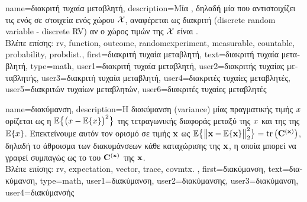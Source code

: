 {name={\foreignlanguage{greek}{διακριτή τυχαία μεταβλητή}}, 
 	description={\foreignlanguage{greek}{Μία} , 
		\foreignlanguage{greek}{δηλαδή μία}  \foreignlanguage{greek}{που αντιστοιχίζει τις}  
		\foreignlanguage{greek}{ενός}  \foreignlanguage{greek}{σε στοιχεία ενός}  
		\foreignlanguage{greek}{χώρου $\mathcal{X}$, αναφέρεται ως διακριτή} (discrete random variable - discrete RV) 
		\foreignlanguage{greek}{αν ο χώρος τιμών της $\mathcal{X}$ είναι}  \cite{BillingsleyProbMeasure}. 
			\\
		\foreignlanguage{greek}{Βλέπε επίσης:} \gls{rv}, \gls{function}, \gls{outcome}, \gls{randomexperiment}, \gls{measurable}, 
		\gls{countable}, \gls{probability}, \gls{probdist}.},
 	first={\foreignlanguage{greek}{διακριτή τυχαία μεταβλητή}},
 	text={\foreignlanguage{greek}{διακριτή τυχαία μεταβλητή}},
	type=math,
	user1={\foreignlanguage{greek}{διακριτή τυχαία μεταβλητή}}, %
   	user2={\foreignlanguage{greek}{διακριτής τυχαίας μεταβλητής}}, %
	user3={\foreignlanguage{greek}{διακριτή τυχαία μεταβλητή}}, %
	user4={\foreignlanguage{greek}{διακριτές τυχαίες μεταβλητές}}, %
   	user5={\foreignlanguage{greek}{διακριτών τυχαίων μεταβλητών}}, %
	user6={\foreignlanguage{greek}{διακριτές τυχαίες μεταβλητές}} %
}

{name={\foreignlanguage{greek}{διακύμανση}},
	description={\foreignlanguage{greek}{Η διακύμανση} (variance) \foreignlanguage{greek}{μίας}
		 \foreignlanguage{greek}{πραγματικής τιμής $x$ ορίζεται ως η}  
		$\mathbb{E}\big\{ \big( x - \mathbb{E}\{x \} \big)^{2} \big\}$ \foreignlanguage{greek}{της τετραγωνικής διαφοράς μεταξύ της $x$ 
		και της}  \foreignlanguage{greek}{της $\mathbb{E}\{x \}$. Επεκτείνουμε αυτόν τον ορισμό σε}  
		 \foreignlanguage{greek}{τιμής ${\bf x}$ ως} 
		$\mathbb{E}\big\{ \big\| {\bf x} - \mathbb{E}\{{\bf x} \} \big\|_{2}^{2} \big\} = {\rm tr} \left(\mathbf{C}^{({\bf x})}\right)$,
		\foreignlanguage{greek}{δηλαδή το άθροισμα των διακυμάνσεων κάθε καταχώρισης της ${\bf x}$, η οποία μπορεί να γραφεί 
		συμπαγώς ως το}  \foreignlanguage{greek}{του}  $\mathbf{C}^{({\bf x})}$ 
		\foreignlanguage{greek}{της} ${\bf x}$.
		\\
		\foreignlanguage{greek}{Βλέπε επίσης:} \gls{rv}, \gls{expectation}, \gls{vector}, \gls{trace}, \gls{covmtx}.} ,
	first={\foreignlanguage{greek}{διακύμανση}},
	text={\foreignlanguage{greek}{διακύμανση}},
	type=math,
	user1={\foreignlanguage{greek}{διακύμανση}}, %
   	user2={\foreignlanguage{greek}{διακύμανσης}}, %
	user3={\foreignlanguage{greek}{διακύμανση}}, %
	user4={\foreignlanguage{greek}{διακύμανσής}} %
}

